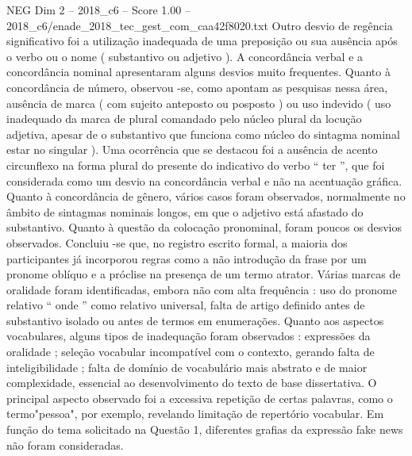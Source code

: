 \begin{textsample}{NEG Dim 2 – 2018\_c6 – Score 1.00 – 2018\_c6/enade\_2018\_tec\_gest\_com\_caa42f8020.txt}
Outro desvio de regência significativo foi a utilização inadequada de uma preposição ou sua ausência após o verbo ou o nome ( substantivo ou adjetivo ).
A concordância verbal e a concordância nominal apresentaram alguns desvios muito frequentes.
Quanto à concordância de número, observou -se, como apontam as pesquisas nessa área, ausência de marca ( com sujeito anteposto ou posposto ) ou uso indevido ( uso inadequado da marca de plural comandado pelo núcleo plural da locução adjetiva, apesar de o substantivo que funciona como núcleo do sintagma nominal estar no singular ).
Uma ocorrência que se destacou foi a ausência de acento circunflexo na forma plural do presente do indicativo do verbo “ ter ”, que foi considerada como um desvio na concordância verbal e não na acentuação gráfica.
Quanto à concordância de gênero, vários casos foram observados, normalmente no âmbito de sintagmas nominais longos, em que o adjetivo está afastado do substantivo.
Quanto à questão da colocação pronominal, foram poucos os desvios observados.
Concluiu -se que, no registro escrito formal, a maioria dos participantes já incorporou regras como a não introdução da frase por um pronome oblíquo e a próclise na presença de um termo atrator.
Várias marcas de oralidade foram identificadas, embora não com alta frequência : uso do pronome relativo “ onde ” como relativo universal, falta de artigo definido antes de substantivo isolado ou antes de termos em enumerações.
Quanto aos aspectos vocabulares, alguns tipos de inadequação foram observados : expressões da oralidade ; seleção vocabular incompatível com o contexto, gerando falta de inteligibilidade ; falta de domínio de vocabulário mais abstrato e de maior complexidade, essencial ao desenvolvimento do texto de base dissertativa.
O principal aspecto observado foi a excessiva repetição de certas palavras, como o termo"pessoa", por exemplo, revelando limitação de repertório vocabular.
Em função do tema solicitado na Questão 1, diferentes grafias da expressão fake news não foram consideradas.

\end{textsample}
